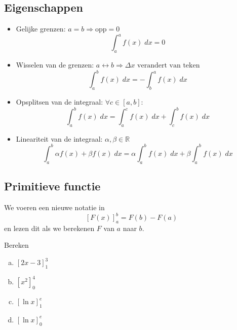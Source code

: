 \documentclass[a4paper,12pt, twoside]{article}
\begin{document}
\subsection{Eigenschappen}

\begin{itemize}
  \item Gelijke grenzen: $a=b \Rightarrow \mbox{opp}=0$
  $$\int_a^a f(x)\;dx = 0$$
  \item Wisselen van de grenzen: $a\leftrightarrow b \Rightarrow \Delta x \mbox{ verandert van teken}$
  $$\int_a^b f(x)\;dx = -\int_b^a f(x)\;dx$$
  \item Opsplitsen van de integraal: $\forall c\in[a,b]:$
  $$\int_a^b f(x)\;dx = \int_a^c f(x)\;dx + \int_c^b f(x)\;dx$$
  \item Lineariteit van de integraal: $\alpha, \beta\in\mathbb{R}$
  $$\int_a^b \alpha f(x) + \beta f(x)\;dx = \alpha \int_a^b f(x) \;dx+ \beta \int_a^b f(x)\;dx$$
\end{itemize}

\subsection{Primitieve functie}

We voeren een nieuwe notatie in
$$[F(x)]_a^b = F(b) - F(a)$$
en lezen dit als we berekenen $F$ van $a$ naar $b$.



\begin{oefening}
Bereken
\begin{multicols}{2}
\begin{enumerate}[(a)]
  \itemsep.5em
  \item $\displaystyle\left[2x-3\right]_1^3$
  \item $\displaystyle\left[x^2\right]_0^4$
  \item $\displaystyle\left[\ln x\right]_1^e$
  \item $\displaystyle\left[\ln x\right]_0^e$
\end{enumerate}
\end{multicols}
\end{oefening}
\end{document}
